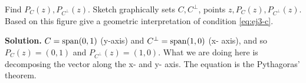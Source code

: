 \begin{enumerate}[label=(\alph*)]
      Find $P_C(z),P_{C^\bot}(z)$. Sketch graphically sets $C,C^\bot$, points
      $z,P_C(z),P_{C^\bot}(z)$. Based on this figure give a geometric
      interpretation of condition \ref{eq:ej3-c}.

      \medskip\textbf{Solution.} $C=\operatorname{span} (0,1)$ (y-axis) and
      $C^\bot=\operatorname{span}(1,0)$ (x- axis), and so $P_C(z)=(0,1)$ and
      $P_{C^\bot}(z)=(1,0)$. What we are doing here is decomposing the vector
      along the x- and y- axis. The equation is the Pythagoras' theorem.

  \end{enumerate}
